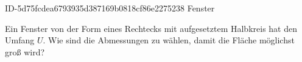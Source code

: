 \begin{exercise}
      {ID-5d75fcdea6793935d387169b0818cf86e2275238}
      {Fenster}
  \ifproblem\problem\par
    Ein Fenster von der Form eines Rechtecks mit aufgesetztem Halbkreis hat den Umfang $U$.
    Wie sind die Abmessungen zu wählen, damit die Fläche möglichst groß wird?
  \fi
\end{exercise}
